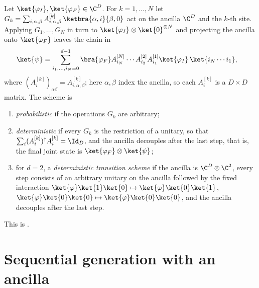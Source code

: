 \begin{definition}
    \label{def:sequential_scheme_ancilla}
    Let $\ket{\varphi_I},\ket{\varphi_F}\in\C^D$. For $k=1,\dots,N$ let
    $G_k=\sum_{i,\alpha,\beta}A^{[k]}_{i,\alpha,\beta}\,
        \ketbra{\alpha,i}{\beta,0}$ act on the ancilla $\C^D$ and the $k$-th site.
    Applying $G_1,\dots,G_N$ in turn to $\ket{\varphi_I}\otimes\ket{0}^{\otimes N}$
    and projecting the ancilla onto $\ket{\varphi_F}$ leaves the chain in
    \begin{align}
        \ket{\psi}
         & =\sum_{i_1,\dots,i_N=0}^{d-1}
        \bra{\varphi_F}A^{[N]}_{i_N}\cdots A^{[2]}_{i_2}A^{[1]}_{i_1}
        \ket{\varphi_I}\,\ket{i_N\cdots i_1},
        \label{eq:sequential_generated_state}
    \end{align}
    where $(A^{[k]}_i)_{\alpha\beta}=A^{[k]}_{i,\alpha,\beta}$; here
    $\alpha,\beta$ index the ancilla, so each $A^{[k]}_i$ is a $D\times D$
    matrix.
    The scheme is
    \begin{enumerate}
        \item \emph{probabilistic} if the operations $G_k$ are arbitrary;
        \item \emph{deterministic} if every $G_k$ is the restriction of a unitary,
              so that $\sum_i (A^{[k]}_i)^\dagger A^{[k]}_i=\Id_D$, and the ancilla
              decouples after the last step, that is, the final joint state is
              $\ket{\varphi_F}\otimes\ket{\psi}$;
        \item for $d=2$, a \emph{deterministic transition scheme} if the ancilla is
              $\C^D\otimes\C^2$, every step consists of an arbitrary unitary on the
              ancilla followed by the fixed interaction
              $\ket{\varphi}\ket{1}\ket{0}\mapsto\ket{\varphi}\ket{0}\ket{1}$,
              $\ket{\varphi}\ket{0}\ket{0}\mapsto\ket{\varphi}\ket{0}\ket{0}$, and the
              ancilla decouples after the last step.
    \end{enumerate}
    This is \cite[Section~5.1]{PerezGarcia2007Matrix}.
\end{definition}

\section{Sequential generation with an ancilla}

